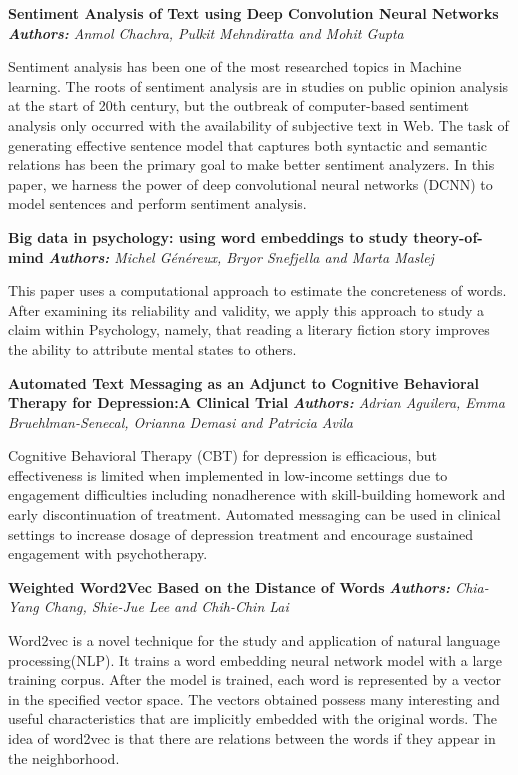 \pagebreak

\noindent
\textbf{Sentiment Analysis of Text using Deep Convolution Neural Networks}
\textit{\textbf{Authors:} Anmol Chachra, Pulkit Mehndiratta and Mohit Gupta}

Sentiment analysis has been one of the most researched topics in Machine learning. The roots of sentiment analysis are in studies on public opinion analysis at the start of 20th century, but the outbreak of computer-based sentiment analysis only occurred with the availability of subjective text in Web. The task of generating effective sentence model that captures both syntactic and semantic relations has been the primary goal to make better sentiment analyzers. In this paper, we harness the power of deep convolutional neural networks (DCNN) to model sentences and perform sentiment analysis.

\noindent
\textbf{Big data in psychology: using word embeddings to study theory-of-mind}
\textit{\textbf{Authors:} Michel Généreux, Bryor Snefjella and Marta Maslej}

This paper uses a computational approach to estimate the concreteness of words. After examining its reliability and validity, we apply this approach to study a claim within Psychology, namely, that reading a literary fiction story improves the ability to attribute mental states to others.

\noindent
\textbf{Automated Text Messaging as an Adjunct to Cognitive Behavioral Therapy for Depression:A Clinical Trial}
\textit{\textbf{Authors:} Adrian Aguilera, Emma Bruehlman-Senecal, Orianna Demasi and Patricia Avila}

Cognitive Behavioral Therapy (CBT) for depression is efficacious, but effectiveness is limited when implemented in low-income settings due to engagement difficulties including nonadherence with skill-building homework and early discontinuation of treatment. Automated messaging can be used in clinical settings to increase dosage of depression treatment and encourage sustained engagement with psychotherapy.

\noindent
\textbf{Weighted Word2Vec Based on the Distance of Words}
\textit{\textbf{Authors:} Chia-Yang Chang, Shie-Jue Lee and Chih-Chin Lai}

Word2vec is a novel technique for the study and application of natural language processing(NLP). It trains a word embedding neural network model with a large training corpus. After the model is trained, each word is represented by a vector in the specified vector space. The vectors obtained possess many interesting and useful characteristics that are implicitly embedded with the original words. The idea of word2vec is that there are relations between the words if they appear in the neighborhood.
